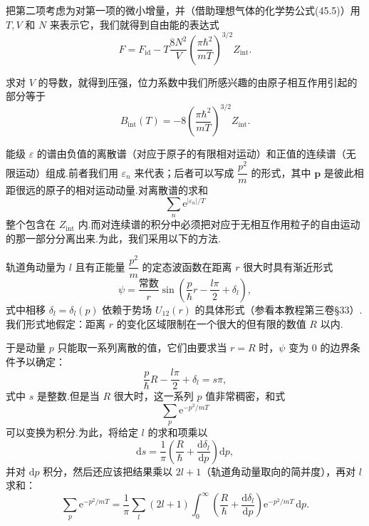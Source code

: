 把第二项考虑为对第一项的微小增量，并（借助理想气体的化学势公式(45.5)）用 $T,V$ 和 $N$ 来表示它，我们就得到自由能的表达式
\begin{equation*}
  F=F_{\mathrm{id}}-T\frac{8N^2}{V}\left(\frac{\pi\hbar^2}{mT}\right)^{3/2}Z_{\mathrm{int}}.
\end{equation*}

求对 $V$ 的导数，就得到压强，位力系数中我们所感兴趣的由原子相互作用引起的部分等于
\begin{equation}
  B_{\mathrm{int}}(T)=-8\left(\frac{\pi\hbar^2}{mT}\right)^{3/2}Z_{\mathrm{int}}.
\end{equation}

能级 $\varepsilon$ 的谱由负值的离散谱（对应于原子的有限相对运动）和正值的连续谱（无限运动）组成.前者我们用 $\varepsilon_n$ 来代表；后者可以写成 $\dfrac{p^2}{m}$ 的形式，其中 $\boldsymbol{p}$ 是彼此相距很远的原子的相对运动动量.对离散谱的求和
\begin{equation*}
  \sum_n\mathrm{e}^{|\varepsilon_n|/T}
\end{equation*}
整个包含在 $Z_{\mathrm{int}}$ 内.而对连续谱的积分中必须把对应于无相互作用粒子的自由运动的那一部分分离出来.为此，我们采用以下的方法.

轨道角动量为 $l$ 且有正能量 $\dfrac{p^2}{m}$ 的定态波函数在距离 $r$ 很大时具有渐近形式
\begin{equation*}
  \psi=\frac{\text{常数}}{r}\sin\left(\frac{p}{\hbar}r-\frac{l\pi}{2}+\delta_l\right),
\end{equation*}
式中相移 $\delta_l=\delta_l(p)$ 依赖于势场 $U_{12}(r)$ 的具体形式（参看本教程第三卷§33）.我们形式地假定：距离 $r$ 的变化区域限制在一个很大的但有限的数值 $R$ 以内.

于是动量 $p$ 只能取一系列离散的值，它们由要求当 $r=R$ 时，$\psi$ 变为 0 的边界条件予以确定：
\begin{equation*}
  \frac{p}{\hbar}R-\frac{l\pi}{2}+\delta_l=s\pi,
\end{equation*}
式中 $s$ 是整数.但是当 $R$ 很大时，这一系列 $p$ 值非常稠密，和式
\begin{equation*}
  \sum_p\mathrm{e}^{-p^2/mT}
\end{equation*}
可以变换为积分.为此，将给定 $l$ 的求和项乘以
\begin{equation*}
  \mathrm{d}s=\frac{1}{\pi}\left(\frac{R}{\hbar}+\frac{\mathrm{d}\delta_l}{\mathrm{d}p}\right)\mathrm{d}p,
\end{equation*}
并对 $\mathrm{d}p$ 积分，然后还应该把结果乘以 $2l+1$（轨道角动量取向的简并度），再对 $l$ 求和：
\begin{equation*}
  \sum_p\mathrm{e}^{-p^2/mT}
  =\frac{1}{\pi}\sum_l(2l+1)\int_0^{\infty}
  \left(\frac{R}{\hbar}+\frac{\mathrm{d}\delta_l}{\mathrm{d}p}\right)
  \mathrm{e}^{-p^2/mT}\,\mathrm{d}p.
\end{equation*}

